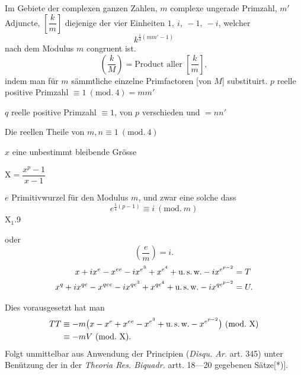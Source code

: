 \NoSourceHead
{}
\par\indent Im Gebiete der complexen ganzen Zahlen, $m$ complexe ungerade Primzahl, $m'$ Adjuncte, $\left[\dfrac km\right]$ diejenige der vier Einheiten $1,\ i,\ -1,\ -i$, welcher
\[
k^{\frac14(mm'-1)}
\]
\noindent nach dem Modulus $m$ congruent ist.
\[
\left(\frac kM\right)=\text{Product aller }\left[\frac km\right],
\]
\noindent indem man für $m$ sämmtliche einzelne Primfactoren [von $M$] substituirt.
\noindent $p$ reelle positive Primzahl $\equiv1\ (\mathrm{mod.}\ 4)=mm'$\par
\noindent $q$ reelle positive Primzahl $\equiv1$\hspace{2em}, von $p$ verschieden und $=nn'$\par
\noindent Die reellen Theile von $m,n\equiv1\ (\mathrm{mod.}\ 4)$\par
\noindent $x$ eine unbestimmt bleibende Grösse\par
\noindent $\mathrm X=\dfrac{x^p-1}{x-1}$\par
\noindent $e$ Primitivwurzel für den Modulus $m$, und zwar eine solche dass
\[
e^{\frac14(p-1)}\equiv i\ (\mathrm{mod.}\ m)
\]
\vfill\noindent X$_1$.\hfill9\par\clearpage

\noindent oder
\[
\left(\frac em\right)=i.
\]
\[
\begin{aligned}
x+ix^e-x^{ee}-ix^{e^3}+x^{e^4}+\text{u.\,s.\,w.}-ix^{e^{p-2}}&=T\\
x^q+ix^{qe}-x^{qee}-ix^{qe^3}+x^{qe^4}+\text{u.\,s.\,w.}-ix^{qe^{p-2}}&=U.
\end{aligned}
\]
\par\noindent\hspace*{\parindent}Dies vorausgesetzt hat man
\[
\begin{aligned}
TT&\equiv-m\bigl(x-x^e+x^{ee}-x^{e^3}+\text{u.\,s.\,w.}-x^{e^{p-2}}\bigr)\ (\mathrm{mod.}\ \mathrm X)\\
&\equiv-mV\ (\mathrm{mod.}\ \mathrm X).
\end{aligned}
\]
\noindent Folgt unmittelbar aus Anwendung der Principien (\textit{Disqu. Ar.} art. 345) unter Benützung der in der \textit{Theoria Res. Biquadr.} artt. 18—20 gegebenen Sätze[*)].

